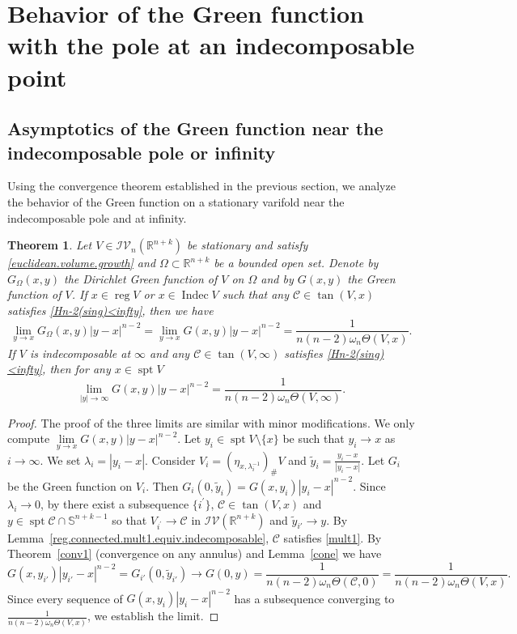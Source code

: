 \documentclass[11pt]{amsart}
\newtheorem{theorem}{Theorem}[section]
\theoremstyle{definition}
\newcommand{\R}{\mathbb{R}}
\newcommand{\C}{\mathcal{C}}
\newcommand{\SSS}{\mathbb{S}}
\newcommand{\IV}{\mathcal{IV}}
\DeclareMathOperator{\spt}{spt}
\DeclareMathOperator{\reg}{reg}
\DeclareMathOperator{\indec}{Indec}
\begin{document}
\section{Behavior of the Green function with the pole at an indecomposable point}\label{behavior.green.function.singular.point}
\subsection{Asymptotics of the Green function near the indecomposable pole or infinity}
Using the convergence theorem established in the previous section, we analyze the behavior of the Green function on a stationary varifold near the indecomposable pole and at infinity.
\begin{theorem}\label{asymp1}
    Let $V\in \IV_n(\R^{n+k})$ be stationary and satisfy \eqref{euclidean.volume.growth} and $\Omega\subset \R^{n+k}$ be a bounded open set. Denote by $G_\Omega(x,y)$ the Dirichlet Green function of $V$ on $\Omega$ and by $G(x,y)$ the Green function of $V$.
    If $x\in \reg V$ or $x\in \indec  V$ such that any $\C\in \tan(V,x)$ satisfies \eqref{Hn-2(sing)<infty}, then we have
    \[\lim_{y\to x}G_\Omega(x,y)|y-x|^{n-2}=\lim_{y\to x}G(x,y)|y-x|^{n-2}=\frac{1}{n(n-2)\omega_n\Theta(V,x)}.
	\]
	If $V$ is indecomposable at $\infty$ and any $\C\in \tan(V,\infty)$ satisfies \eqref{Hn-2(sing)<infty}, then for any $x\in\spt V$
	\[\lim_{|y|\to \infty}G(x,y)|y-x|^{n-2}=\frac{1}{n(n-2)\omega_n\Theta(V,\infty)}.\]
\end{theorem}
\begin{proof}The proof of the three limits are similar with minor modifications. We only compute $\lim\limits_{y\to x}G(x,y)|y-x|^{n-2}$.
	Let $y_i\in \spt V\setminus \{x\}$ be such that $y_i\to x$ as $i\to\infty$. We set $\lambda_i=|y_i-x|$. Consider $V_i=(\eta_{x,\lambda_i^{-1}})_\# V$ and $\tilde y_i=\frac{y_i-x}{|y_i-x|}$. Let $G_i$ be the Green function on $V_i$. Then $G_i(0,\tilde y_i)=G(x,y_i)|y_i-x|^{n-2}$. Since $\lambda_i\to0$, by \cite[Theorem 42.7]{Sim} there exist a subsequence $\{i^\prime\}$, $\C\in \tan(V,x)$ and $y\in \spt \C\cap \SSS^{n+k-1}$ so that $V_{i^\prime}\to \C$ in $\IV(\R^{n+k})$ and $\tilde y_{i'}\to y$. By Lemma~\ref{reg.connected.mult1.equiv.indecomposable}, $\C$ satisfies \eqref{mult1}. By Theorem~\ref{conv1} (convergence on any annulus) and Lemma~\ref{cone} we have \[G(x,y_{i'})|y_{i'}-x|^{n-2}=G_{i'}(0,\tilde y_{i'})\to G(0,y)=\frac{1}{n(n-2)\omega_n\Theta(\C,0)}=\frac{1}{n(n-2)\omega_n\Theta(V,x)}.\] Since every sequence of $G(x,y_i)|y_i-x|^{n-2}$ has a subsequence converging to $\frac{1}{n(n-2)\omega_n\Theta(V,x)}$, we establish the limit.
\end{proof}
\end{document}
